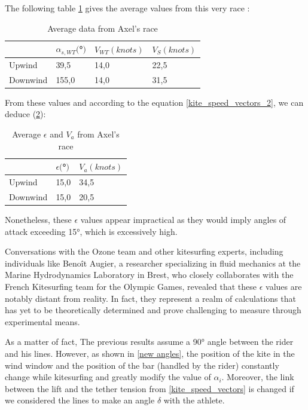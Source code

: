 The following table \ref{tab:Average_data_from_Axels_race} gives the average values from this very race : 

\begin{table}[H]
    \center
    \begin{tabular}{|l|l|l|l|}
        \hline
            & $\alpha_{s, WT} ($°$) $ & $V_{WT} (knots) $ & $V_{S} (knots) $ \tabularnewline
        \hline
        Upwind & 39,5 & 14,0 & 22,5  \tabularnewline
        \hline
        Downwind & 155,0 & 14,0 & 31,5  \tabularnewline
        \hline
    \end{tabular}
    \caption{Average data from Axel's race}
    \label{tab:Average_data_from_Axels_race}
\end{table}

From these values and according to the equation \ref{kite_speed_vectors_2}, we can deduce (\ref{tab:Average_data_from_Axel's_race_2}): 

\begin{table}[H]
    \center
    \begin{tabular}{|l|l|l|}
        \hline
             & $\epsilon ($°$) $ & $V_{a} (knots) $ \tabularnewline
        \hline
        Upwind & 15,0 & 34,5  \tabularnewline
        \hline  
        Downwind & 15,0 & 20,5  \tabularnewline
        \hline
    \end{tabular}
    \caption{Average $\epsilon$ and $V_{a}$ from Axel's race}
    \label{tab:Average_data_from_Axel's_race_2}
\end{table}

Nonetheless, these $\epsilon$ values appear impractical as they would imply angles of attack exceeding 15°, which is excessively high.

Conversations with the Ozone team and other kitesurfing experts, including individuals like Benoît Augier, a researcher specializing in fluid mechanics at the Marine Hydrodynamics Laboratory in Brest, who closely collaborates with the French Kitesurfing team for the Olympic Games, revealed that these $\epsilon$ values are notably distant from reality. In fact, they represent a realm of calculations that has yet to be theoretically determined and prove challenging to measure through experimental means.

As a matter of fact, The previous results assume a 90° angle between the rider and his lines. However, as shown in \ref{new angles}, the position of the kite in the wind window and the position of the bar (handled by the rider) constantly change while kitesurfing and greatly modify the value of $\alpha_{i}$. Moreover, the link between the lift and the tether tension from \ref{kite_speed_vectors} is changed if we considered the lines to make an angle $\delta$ with the athlete.

